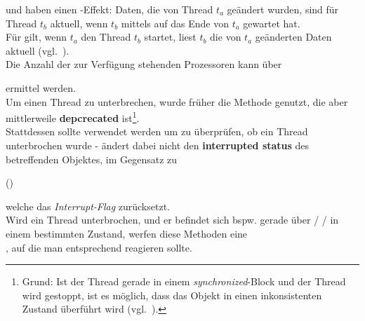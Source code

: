 \noindent
{} und  haben einen -Effekt: Daten, die von Thread $t_a$ geändert wurden, sind für Thread $t_b$ aktuell, wenn $t_b$ mittels  auf das Ende von $t_a$ gewartet hat.\\
Für  gilt, wenn $t_a$ den Thread $t_b$ startet, liest $t_b$ die von $t_a$ geänderten Daten aktuell (vgl.~\cite[37]{Oec22}).\\

\noindent
Die Anzahl der zur Verfügung stehenden Prozessoren kann über

\begin{center}
\end{center}

ermittel werden.\\

\noindent
Um einen Thread zu unterbrechen, wurde früher die Methode  genutzt, die aber mittlerweile \textbf{depcrecated} ist\footnote{
Grund: Ist der Thread gerade in einem \textit{synchronized}-Block und der Thread wird gestoppt, ist es möglich, dass das Objekt in einen inkonsistenten Zustand überführt wird (vgl.~\cite[40]{Oec22}).
}.\\
Stattdessen sollte  verwendet werden um zu überprüfen, ob ein Thread unterbrochen wurde -  ändert dabei nicht den \textbf{interrupted status} des betreffenden Objektes, im Gegensatz zu
\begin{center}
 ()
\end{center}
welche das \textit{Interrupt-Flag} zurücksetzt.\\

\noindent
Wird ein Thread unterbrochen, und er befindet sich bspw. gerade über  /  /  in einem bestimmten Zustand, werfen diese Methoden eine\\
, auf die man entsprechend reagieren sollte.

